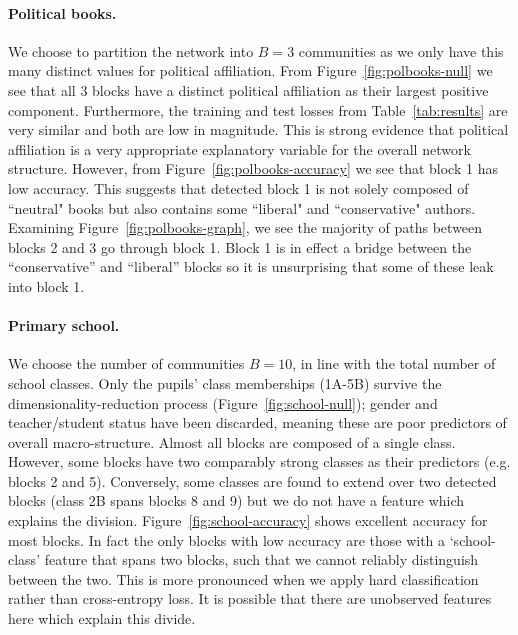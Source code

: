 \paragraph{\textbf{Political books.}}

We choose to partition the network into $B=3$ communities as we only have this many distinct values for political affiliation.
From Figure~\ref{fig:polbooks-null} we see that all 3 blocks have a distinct political affiliation as their largest positive component.  
Furthermore, the training and test losses from Table~\ref{tab:results}  
are very similar and both are low in magnitude. This is strong evidence 
that political affiliation is a very appropriate explanatory 
variable for the overall network structure.
%
However, from Figure~\ref{fig:polbooks-accuracy} we see that block 1 has low accuracy. 
This suggests that detected block 1 is not solely composed of ``neutral" books but also 
contains some ``liberal" and ``conservative" authors. Examining 
Figure~\ref{fig:polbooks-graph}, we see the majority of paths between blocks 2 and 3 go through block 1.
Block 1 is in effect a bridge between the ``conservative'' and ``liberal'' blocks so it is unsurprising that some of these leak into block 1.

\paragraph{\textbf{Primary school.}}

We choose the number of communities $B=10$, in line with the total number of 
school classes. Only the pupils' class memberships (1A-5B) survive
the dimensionality-reduction process (Figure~\ref{fig:school-null});
gender and teacher/student status have been discarded,
meaning these are poor predictors of overall macro-structure.
%
Almost all blocks are composed of a single class. 
However, some blocks have two comparably strong classes as their predictors (e.g. blocks 2 and 5). 
Conversely, some classes are found to extend over two 
detected blocks (class 2B spans blocks 8 and 9) but we do 
not have a feature which explains the division.
%
Figure~\ref{fig:school-accuracy} shows excellent accuracy for most blocks. In fact the only blocks with low accuracy are those with a `school-class'
feature that spans two blocks, such that we cannot reliably distinguish between the two. This is more pronounced when we apply hard classification rather than cross-entropy loss. It is possible that there are unobserved features here
which explain this divide.

